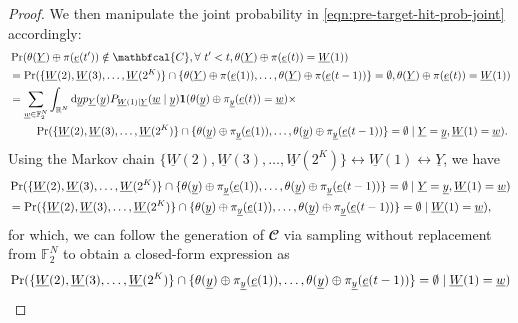 \documentclass[letterpaper,draftclsnofoot,onecolumn]{IEEEtran}
\begin{document}
\begin{proof}
    We then manipulate the joint probability in \eqref{eqn:pre-target-hit-prob-joint} accordingly:
    \begin{align}
        & \Pr(\theta(\underline{Y})\oplus \pi(\underline{e}(t'))\notin \mathbfcal{C},\forall\ t'< t, \theta(\underline{Y})\oplus \pi(\underline{e}(t))=\underline{W}(1)) \notag\\
        &= \Pr(\{\underline{W}(2),\underline{W}(3),\ldots,\underline{W}(2^K)\}\cap\{\theta(\underline{Y})\oplus \pi(\underline{e}(1)),\ldots,\theta(\underline{Y})\oplus \pi(\underline{e}(t - 1))\} = \emptyset, \theta(\underline{Y})\oplus \pi(\underline{e}(t))=\underline{W}(1))\notag\\
        &= \sum_{\underline{w} \in \mathbb{F}_2^N} \int_{\mathbb{R}^N} \mathrm{d}\underline{y} p_{\underline{Y}}(\underline{y}) P_{\underline{W}(1)|\underline{Y}}(\underline{w} \mid \underline{y}) \mathbf{1}(\theta(\underline{y})\oplus \pi_{\underline{y}}(\underline{e}(t))=\underline{w}) \times\notag\\
        &\quad\quad\ \Pr(\{\underline{W}(2),\underline{W}(3),\ldots,\underline{W}(2^K)\}\cap\{\theta(\underline{y})\oplus \pi_{\underline{y}}(\underline{e}(1)),\ldots,\theta(\underline{y})\oplus \pi_{\underline{y}}(\underline{e}(t - 1))\} = \emptyset \mid \underline{Y} = \underline{y}, \underline{W}(1) = \underline{w}).\label{eqn:emptyset-y-W1}
    \end{align}
    Using the Markov chain $\{\underline{W}(2),\underline{W}(3),\ldots,\underline{W}(2^K)\} \leftrightarrow \underline{W}(1) \leftrightarrow \underline{Y}$, we have
    \begin{align}
        &\Pr(\{\underline{W}(2),\underline{W}(3),\ldots,\underline{W}(2^K)\}\cap\{\theta(\underline{y})\oplus \pi_{\underline{y}}(\underline{e}(1)),\ldots,\theta(\underline{y})\oplus \pi_{\underline{y}}(\underline{e}(t - 1))\} = \emptyset \mid \underline{Y} = \underline{y}, \underline{W}(1) = \underline{w}) \notag\\
        &= \Pr(\{\underline{W}(2),\underline{W}(3),\ldots,\underline{W}(2^K)\}\cap\{\theta(\underline{y})\oplus \pi_{\underline{y}}(\underline{e}(1)),\ldots,\theta(\underline{y})\oplus \pi_{\underline{y}}(\underline{e}(t - 1))\} = \emptyset \mid \underline{W}(1) = \underline{w}),
    \end{align}
    for which, we can follow the generation of $\mathbfcal{C}$ via sampling without replacement from $\mathbb{F}_2^N$ to obtain a closed-form expression as
    \begin{align}
        &\Pr(\{\underline{W}(2),\underline{W}(3),\ldots,\underline{W}(2^K)\}\cap\{\theta(\underline{y})\oplus \pi_{\underline{y}}(\underline{e}(1)),\ldots,\theta(\underline{y})\oplus \pi_{\underline{y}}(\underline{e}(t - 1))\} = \emptyset \mid \underline{W}(1) = \underline{w}) \notag\\

\end{align}
\end{proof}
\end{document}
